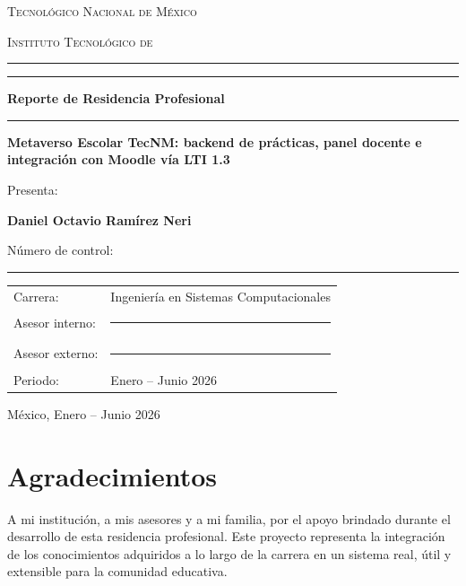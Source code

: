 \documentclass[12pt,letterpaper,oneside]{report}
\newcommand{\Institucion}{Tecnológico Nacional de México}
\newcommand{\Instituto}{Instituto Tecnológico de \rule{4.2cm}{0.4pt}}
\newcommand{\Carrera}{Ingeniería en Sistemas Computacionales}
\newcommand{\TituloProyecto}{Metaverso Escolar TecNM: backend de prácticas, panel docente e integración con Moodle vía LTI 1.3}
\newcommand{\Alumno}{Daniel Octavio Ramírez Neri}
\newcommand{\NumControl}{\rule{3.5cm}{0.4pt}}
\newcommand{\AsesorInterno}{\rule{5cm}{0.4pt}}
\newcommand{\AsesorExterno}{\rule{5cm}{0.4pt}}
\newcommand{\Periodo}{Enero -- Junio 2026}
\newcommand{\Lugar}{México}
\begin{document}
\begin{titlepage}
\centering
\vspace*{0.5cm}
{\scshape\large \Institucion\par}
\vspace{0.2cm}
{\scshape \Instituto\par}
\vspace{1.2cm}

\rule{\linewidth}{0.5pt}\par
\vspace{0.4cm}
{\Huge\bfseries\color{azultec} Reporte de Residencia Profesional\par}
\vspace{0.4cm}
\rule{\linewidth}{0.5pt}\par
\vspace{1.4cm}

{\large\bfseries \TituloProyecto\par}
\vspace{2.2cm}

{\large Presenta:\par}
\vspace{0.2cm}
{\Large\bfseries \Alumno\par}
\vspace{0.2cm}
{\normalsize Número de control: \NumControl\par}
\vspace{1.6cm}

\begin{tabular}{ll}
Carrera: & \Carrera \\[4pt]
Asesor interno: & \AsesorInterno \\[4pt]
Asesor externo: & \AsesorExterno \\[4pt]
Periodo: & \Periodo \\
\end{tabular}

\vfill
{\large \Lugar, \Periodo\par}
\end{titlepage}


\chapter*{Agradecimientos}
A mi institución, a mis asesores y a mi familia, por el apoyo brindado durante el
desarrollo de esta residencia profesional. Este proyecto representa la
integración de los conocimientos adquiridos a lo largo de la carrera en un
sistema real, útil y extensible para la comunidad educativa.
\end{document}

